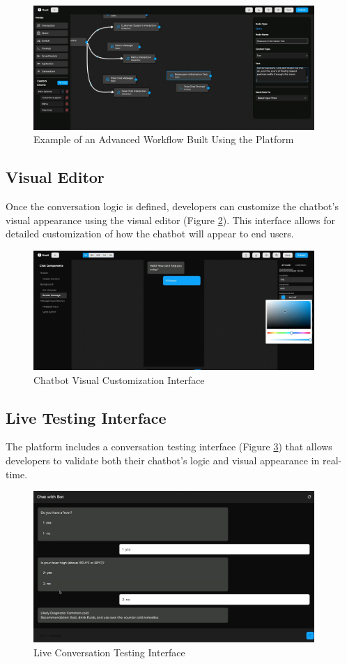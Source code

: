 \begin{figure}[H]
    \centering
    \includegraphics[width=0.95\textwidth]{assets/screenshots/workflow2.jpg}
    \caption{Example of an Advanced Workflow Built Using the Platform}
    \label{fig:workflow2}
\end{figure}

\subsection{Visual Editor}
Once the conversation logic is defined, developers can customize the chatbot's visual appearance using the visual editor (Figure \ref{fig:chatbot-visual-editor}). This interface allows for detailed customization of how the chatbot will appear to end users.

\begin{figure}[H]
    \centering
    \includegraphics[width=0.95\textwidth]{assets/screenshots/chatbot-visual-editor.jpg}
    \caption{Chatbot Visual Customization Interface}
    \label{fig:chatbot-visual-editor}
\end{figure}

\subsection{Live Testing Interface}
The platform includes a conversation testing interface (Figure \ref{fig:conversation}) that allows developers to validate both their chatbot's logic and visual appearance in real-time.

\begin{figure}[H]
    \centering
    \includegraphics[width=0.95\textwidth]{assets/screenshots/conversation.jpg}
    \caption{Live Conversation Testing Interface}
    \label{fig:conversation}
\end{figure}
